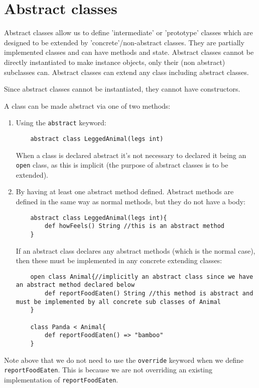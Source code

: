 \documentclass[conc-doc]{subfiles}
\begin{document}
\section{Abstract classes}
Abstract classes allow us to define 'intermediate' or 'prototype' classes which are designed to be extended by 'concrete'/non-abstract classes. They are partially implemented classes and can have methods and state. Abstract classes cannot be directly instantiated to make instance objects, only their (non abstract) subclasses can. Abstract classes can extend any class including abstract classes.

Since abstract classes cannot be instantiated, they cannot have constructors. 

A class can be made abstract via one of two methods:
\begin{enumerate}
	\item Using the \lstinline{abstract} keyword:
	\begin{lstlisting}
	abstract class LeggedAnimal(legs int)
	\end{lstlisting}

	When a class is declared abstract it's not necessary to declared it being an \lstinline{open} class, as this is implicit (the purpose of abstract classes is to be extended).

	\item By having at least one abstract method defined. Abstract methods are defined in the same way as normal methods, but they do not have a body:
	\begin{lstlisting}
	abstract class LeggedAnimal(legs int){
		def howFeels() String //this is an abstract method
	}
	\end{lstlisting}
	
	If an abstract class declares any abstract methods (which is the normal case), then these must be implemented in any concrete extending classes:
	
	\begin{lstlisting}
	open class Animal{//implicitly an abstract class since we have an abstract method declared below
		def reportFoodEaten() String //this method is abstract and must be implemented by all concrete sub classes of Animal
	}
	
	class Panda < Animal{
		def reportFoodEaten() => "bamboo"
	}
	\end{lstlisting}
\end{enumerate}

Note above that we do not need to use the \lstinline{override} keyword when we define \lstinline{reportFoodEaten}. This is because we are not overriding an existing implementation of \lstinline{reportFoodEaten}.
\end{document}
